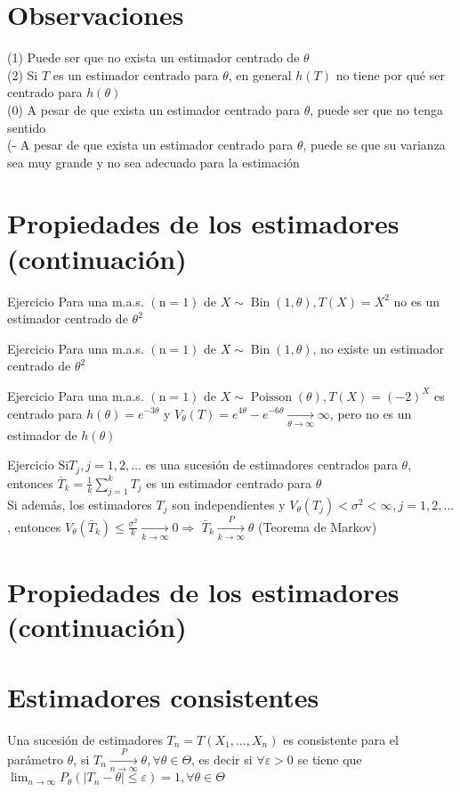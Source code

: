 \section*{Observaciones}
 (1) Puede ser que no exista un estimador centrado de $\theta$\\
(2) Si $T$ es un estimador centrado para $\theta$, en general $h(T)$ no tiene por qué ser centrado para $h(\theta)$\\
(0) A pesar de que exista un estimador centrado para $\theta$, puede ser que no tenga sentido\\
(- A pesar de que exista un estimador centrado para $\theta$, puede se que su varianza sea muy grande y no sea adecuado para la estimación

\section*{Propiedades de los estimadores (continuación)}
Ejercicio Para una m.a.s. $(\mathrm{n}=1)$ de $X \sim \operatorname{Bin}(1, \theta), T(X)=X^{2}$ no es un estimador centrado de $\theta^{2}$

Ejercicio Para una m.a.s. $(\mathrm{n}=1)$ de $X \sim \operatorname{Bin}(1, \theta)$, no existe un estimador centrado de $\theta^{2}$

Ejercicio Para una m.a.s. $(\mathrm{n}=1)$ de $X \sim \operatorname{Poisson}(\theta), T(X)=(-2)^{X}$ es centrado para $h(\theta)=e^{-3 \theta}$ y $V_{\theta}(T)=e^{4 \theta}-e^{-6 \theta} \underset{\theta \rightarrow \infty}{\longrightarrow} \infty$, pero no es un estimador de $h(\theta)$

Ejercicio $\mathrm{Si} T_{j}, j=1,2, \ldots$ es una sucesión de estimadores centrados para $\theta$, entonces $\bar{T}_{k}=\frac{1}{k} \sum_{j=1}^{k} T_{j}$ es un estimador centrado para $\theta$\\
Si además, los estimadores $T_{j}$ son independientes y $V_{\theta}\left(T_{j}\right)<\sigma^{2}<\infty, j=1,2, \ldots$, entonces $V_{\theta}\left(\bar{T}_{k}\right) \leq \frac{\sigma^{2}}{k} \underset{k \rightarrow \infty}{\longrightarrow} 0 \Rightarrow$ $\bar{T}_{k} \xrightarrow[k \rightarrow \infty]{P} \theta$ (Teorema de Markov)

\section*{Propiedades de los estimadores (continuación)}
\section*{Estimadores consistentes}
Una sucesión de estimadores $T_{n}=T\left(X_{1}, \ldots, X_{n}\right)$ es consistente para el parámetro $\theta$, si $T_{n} \xrightarrow[n \rightarrow \infty]{P} \theta, \forall \theta \in \Theta$, es decir si $\forall \varepsilon>0$ se tiene que $\lim _{n \rightarrow \infty} P_{\theta}\left(\left|T_{n}-\theta\right| \leq \varepsilon\right)=1, \forall \theta \in \Theta$

